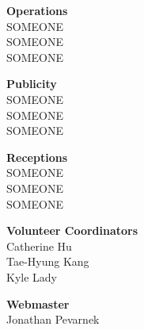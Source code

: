 \documentclass{article}
\begin{document}
\begin{multicols}{2}
\begin{minipage}{\columnwidth}
\end{minipage}
	\begin{minipage}{\columnwidth}
	{\bf Operations}\\
	SOMEONE\\
	SOMEONE\\
	SOMEONE\\
	
\end{minipage}
	\begin{minipage}{\columnwidth}
	{\bf Publicity}\\
	SOMEONE\\
	SOMEONE\\
	SOMEONE\\
	
\end{minipage}
	\begin{minipage}{\columnwidth}
	{\bf Receptions}\\
	SOMEONE\\
	SOMEONE\\
	SOMEONE\\
	
\end{minipage}
	\begin{minipage}{\columnwidth}
	{\bf Volunteer Coordinators}\\
	Catherine Hu\\
	Tae-Hyung Kang\\
	Kyle Lady\\
	
\end{minipage}
	\begin{minipage}{\columnwidth}
	{\bf Webmaster}\\
	Jonathan Pevarnek\\
	
\end{minipage}
	\end{multicols}\newpage
\startcompanysection
{}
\end{document}
